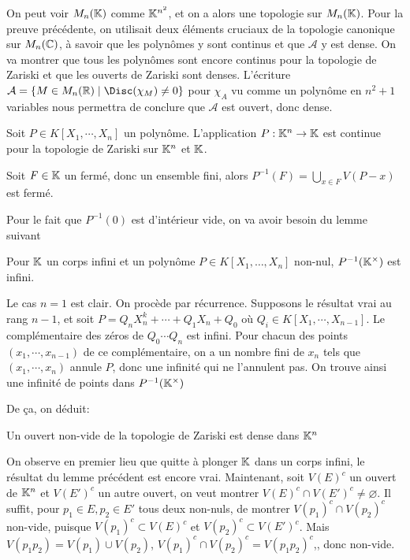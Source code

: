 \documentclass{article}
\begin{document}
On peut voir $M_n(\mathbb{K})$ comme $\mathbb{K}^{n^2}$, et on a alors une topologie sur $M_n(\mathbb{K})$. Pour la preuve précédente, on utilisait deux éléments cruciaux de la topologie canonique sur $M_n(\mathbb{C})$, à savoir que les polynômes y sont continus et que $\mathcal{A}$ y est dense. On va montrer que tous les polynômes sont encore continus pour la topologie de Zariski et que les ouverts de Zariski sont denses. L'écriture $\mathcal{A} = \{M \in M_n(\bR) \mid \Disc(\chi_M) \neq 0\}$ pour $\chi_A$ vu comme un polynôme en $n^2 + 1$ variables nous permettra de conclure que $\mathcal{A}$ est ouvert, donc dense.

\begin{proposition}
    Soit $P \in K[X_1, \cdots, X_n]$ un polynôme. L'application $P: \mathbb{K}^n \to \mathbb{K}$ est continue pour la topologie de Zariski sur $\mathbb{K}^n$ et $\mathbb{K}$.
\end{proposition}

\begin{preuve}
    Soit $F \in \mathbb{K}$ un fermé, donc un ensemble fini, alors $P^{-1}(F) = \bigcup_{x \in F}{V(P-x)}$ est fermé.
\end{preuve}

Pour le fait que $P^{-1}(0)$ est d'intérieur vide, on va avoir besoin du lemme suivant
\begin{lemme}
    Pour $\mathbb{K}$ un corps infini et un polynôme $P \in K[X_1, \ldots, X_n]$ non-nul, $P^{-1}(\mathbb{K}^\times)$ est infini.\\
\end{lemme}

\begin{preuve}
    Le cas $n = 1$ est clair. On procède par récurrence. Supposons le résultat vrai au rang $n-1$, et soit $P = Q_nX_n^k + \cdots + Q_1X_n + Q_0$ où $Q_i \in K[X_1, \cdots, X_{n-1}]$. Le complémentaire des zéros de $Q_0\cdots Q_n$ est infini. Pour chacun des points $(x_1, \cdots, x_{n-1})$ de ce complémentaire, on a un nombre fini de $x_n$ tels que $(x_1, \cdots, x_n)$ annule $P$, donc une infinité qui ne l'annulent pas. On trouve ainsi une infinité de points dans $P^{-1}(\mathbb{K}^\times)$
\end{preuve}

De ça, on déduit:

\begin{proposition}
    Un ouvert non-vide de la topologie de Zariski est dense dans $\mathbb{K}^n$
\end{proposition}

\begin{preuve}
    On observe en premier lieu que quitte à plonger $\mathbb{K}$ dans un corps infini, le résultat du lemme précédent est encore vrai. Maintenant, soit $V(E)^c$ un ouvert de $\mathbb{K}^n$ et $V(E')^c$ un autre ouvert, on veut montrer $V(E)^c \cap V(E')^c \neq \varnothing$. Il suffit, pour $p_1 \in E, p_2 \in E'$ tous deux non-nuls, de montrer $V(p_1)^c \cap V(p_2)^c$ non-vide, puisque $V(p_1)^c \subset V(E)^c$ et $V(p_2)^c \subset V(E')^c$. Mais $V(p_1p_2) = V(p_1) \cup V(p_2)$, $V(p_1)^c \cap V(p_2)^c = V(p_1p_2)^c$,, donc non-vide.
\end{preuve}
\end{document}
